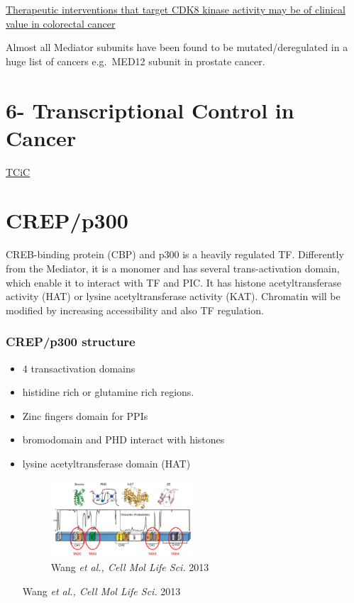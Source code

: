 \underline{Therapeutic interventions that target CDK8 kinase activity may be of clinical value in colorectal cancer}

Almost all Mediator subunits have been found to be mutated/deregulated in a huge list of cancers e.g.~MED12 subunit in prostate cancer.

\hypertarget{transcriptional-control-in-cancer}{%
\section{6- Transcriptional Control in Cancer}\label{transcriptional-control-in-cancer}}

\href{https://www.notion.so/TCiC-08701b51973a4b22a16e226a1fbd7e9b}{TCiC}

\hypertarget{crepp300}{%
\section{CREP/p300}\label{crepp300}}

CREB-binding protein (CBP) and p300 is a heavily regulated TF. Differently from the Mediator, it is a monomer and has several trans-activation domain, which enable it to interact with TF and PIC. It has histone acetyltransferase activity (HAT) or lysine acetyltransferase activity (KAT). Chromatin will be modified by increasing accessibility and also TF regulation.

\hypertarget{crepp300-structure}{%
\subsubsection{CREP/p300 structure}\label{crepp300-structure}}

\begin{itemize}
\item
  4 transactivation domains
\item
  histidine rich or glutamine rich regions.
\item
  Zinc fingers domain for PPIs
\item
  bromodomain and PHD interact with histones
\item
  lysine acetyltransferase domain (HAT)

  \begin{figure}
  \centering
  \includegraphics[width=0.5\textwidth]{../_resources/Screenshot_2022-10-12_at_08-56-06.png}
  \caption{Wang \emph{et al., Cell Mol Life Sci.} 2013}
  \end{figure}

  Wang \emph{et al., Cell Mol Life Sci.} 2013
\end{itemize}

